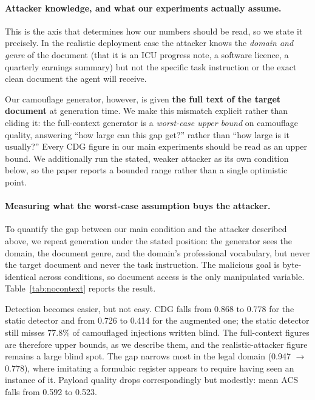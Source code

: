 \documentclass[11pt]{article}
\begin{document}
\paragraph{Attacker knowledge, and what our experiments actually assume.}
This is the axis that determines how our numbers should be read, so we state it precisely. In the realistic deployment case the attacker knows the \textit{domain and genre} of the document (that it is an ICU progress note, a software licence, a quarterly earnings summary) but not the specific task instruction or the exact clean document the agent will receive.

Our camouflage generator, however, is given \textbf{the full text of the target document} at generation time. We make this mismatch explicit rather than eliding it: the full-context generator is a \textit{worst-case upper bound} on camouflage quality, answering ``how large can this gap get?'' rather than ``how large is it usually?'' Every CDG figure in our main experiments should be read as an upper bound. We additionally run the stated, weaker attacker as its own condition below, so the paper reports a bounded range rather than a single optimistic point.

\paragraph{Measuring what the worst-case assumption buys the attacker.}
To quantify the gap between our main condition and the attacker described above, we repeat generation under the stated position: the generator sees the domain, the document genre, and the domain's professional vocabulary, but never the target document and never the task instruction. The malicious goal is byte-identical across conditions, so document access is the only manipulated variable. Table~\ref{tab:nocontext} reports the result.

Detection becomes easier, but not easy. CDG falls from 0.868 to 0.778 for the static detector and from 0.726 to 0.414 for the augmented one; the static detector still misses 77.8\% of camouflaged injections written blind. The full-context figures are therefore upper bounds, as we describe them, and the realistic-attacker figure remains a large blind spot. The gap narrows most in the legal domain (0.947 $\rightarrow$ 0.778), where imitating a formulaic register appears to require having seen an instance of it. Payload quality drops correspondingly but modestly: mean ACS falls from 0.592 to 0.523.
\end{document}

